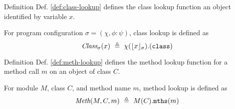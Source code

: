 Definition Def. \ref{def:class-lookup} defines the class lookup function an object 
identified by variable $x$.
\begin{definition}
\label{def:class-lookup}
For program configuration $\sigma = (\chi, \phi : \psi)$, class lookup is defined as 
$$\class{\sigma}{x}\ \triangleq\ \chi(\interpret{\sigma}{x}).(\texttt{class})$$
\end{definition}

Definition Def. \ref{def:meth-lookup} defines the method lookup function for a method
call $m$ on an object of class $C$.
\begin{definition}
\label{def:meth-lookup}
For module $M$, class $C$, and method name $m$, method lookup is defined as 
$$\meth{M}{C}{m}\ \triangleq\ M(C).\texttt{mths}(m)$$
\end{definition}

